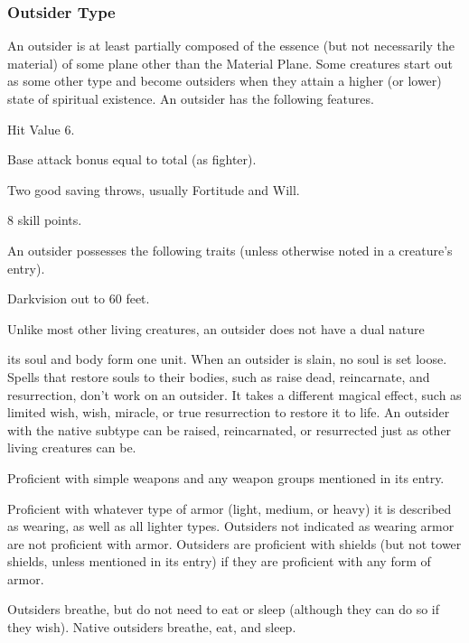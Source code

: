 {\subsubsection{Outsider Type} An outsider is at least partially composed of the essence (but not necessarily the material) of some plane other than the Material Plane. Some creatures start out as some other type and become outsiders when they attain a higher (or lower) state of spiritual existence.
 An outsider has the following features.
\begin{itemize*}
\item Hit Value 6.
\item Base attack bonus equal to total  (as fighter).
\item Two good saving throws, usually Fortitude and Will.
\item 8 skill points.
\end{itemize*}
 An outsider possesses the following traits (unless otherwise noted in a creature's entry).
\begin{itemize*}
\item Darkvision out to 60 feet.
\item Unlike most other living creatures, an outsider does not have a dual nature\item its soul and body form one unit. When an outsider is slain, no soul is set loose. Spells that restore souls to their bodies, such as raise dead, reincarnate, and resurrection, don't work on an outsider. It takes a different magical effect, such as limited wish, wish, miracle, or true resurrection to restore it to life. An outsider with the native subtype can be raised, reincarnated, or resurrected just as other living creatures can be.
\item Proficient with simple weapons and any weapon groups mentioned in its entry.
\item Proficient with whatever type of armor (light, medium, or heavy) it is described as wearing, as well as all lighter types. Outsiders not indicated as wearing armor are not proficient with armor. Outsiders are proficient with shields (but not tower shields, unless mentioned in its entry) if they are proficient with any form of armor.
\item Outsiders breathe, but do not need to eat or sleep (although they can do so if they wish). Native outsiders breathe, eat, and sleep.
\end{itemize*}

}
